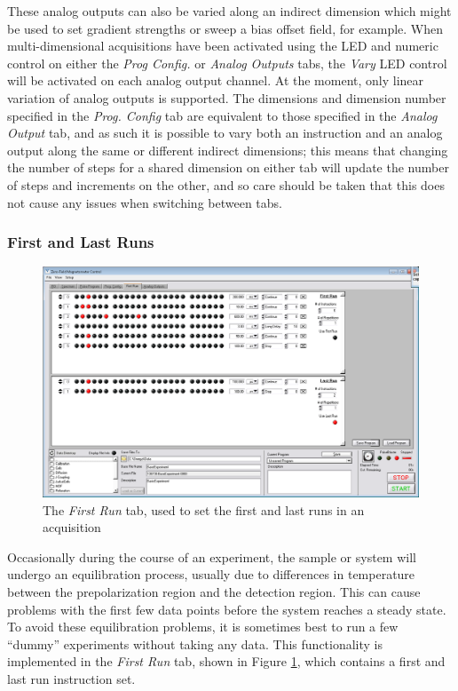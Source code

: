 \documentclass[PaulGanssle-Thesis.tex]{subfiles}
\begin{document}
These analog outputs can also be varied along an indirect dimension which might be used to set gradient strengths or sweep a bias offset field, for example. When multi-dimensional acquisitions have been activated using the LED and numeric control on either the \textit{Prog Config.} or \textit{Analog Outputs} tabs, the \textit{Vary} LED control will be activated on each analog output channel. At the moment, only linear variation of analog outputs is supported. The dimensions and dimension number specified in the \textit{Prog. Config} tab are equivalent to those specified in the \textit{Analog Output} tab, and as such it is possible to vary both an instruction and an analog output along the same or different indirect dimensions; this means that changing the number of steps for a shared dimension on either tab will update the number of steps and increments on the other, and so care should be taken that this does not cause any issues when switching between tabs.

\subsubsection{First and Last Runs}
\label{console.software.first.runs}
\begin{figure}[!h]
\includegraphics[width=\tw]{figures/console/FirstRun.PNG}
\caption{The \textit{First Run} tab, used to set the first and last runs in an acquisition}
\label{fig:FirstRunTab}
\end{figure}

Occasionally during the course of an experiment, the sample or system will undergo an equilibration process, usually due to differences in temperature between the prepolarization region and the detection region. This can cause problems with the first few data points before the system reaches a steady state. To avoid these equilibration problems, it is sometimes best to run a few ``dummy'' experiments without taking any data. This functionality is implemented in the \textit{First Run} tab, shown in Figure \ref{fig:FirstRunTab}, which contains a first and last run instruction set.
\end{document}
